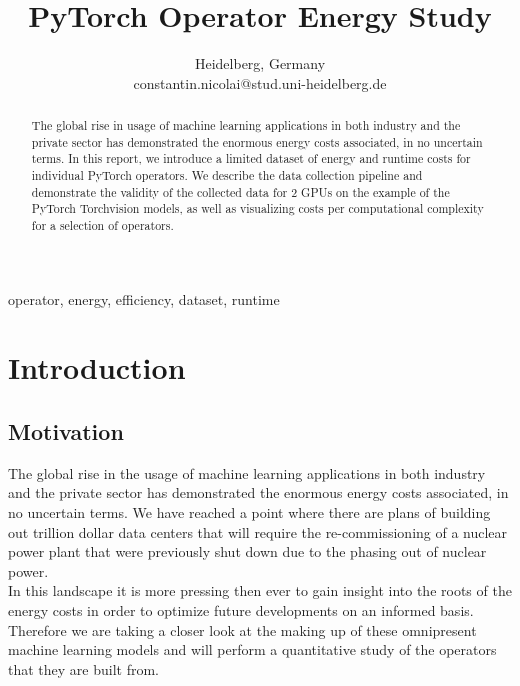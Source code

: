 \documentclass[conference]{IEEEtran}
\begin{document}
\title{PyTorch Operator Energy Study}

\author{
Heidelberg, Germany \\
constantin.nicolai@stud.uni-heidelberg.de}


\maketitle

\begin{abstract}
The global rise in usage of machine learning applications in both industry and the private sector has demonstrated the enormous energy costs associated, in no uncertain terms. In this report, we introduce a limited dataset of energy and runtime costs for individual PyTorch operators. We describe the data collection pipeline and demonstrate the validity of the collected data for 2 GPUs on the example of the PyTorch Torchvision models, as well as visualizing costs per computational complexity for a selection of operators.
\end{abstract}

\begin{IEEEkeywords}
operator, energy, efficiency, dataset, runtime
\end{IEEEkeywords}

\section{Introduction}


\subsection{Motivation}
The global rise in the usage of machine learning applications in both industry and the private sector has demonstrated the enormous energy costs associated, in no uncertain terms. We have reached a point where there are plans of building out trillion dollar data centers that will require the re-commissioning of a nuclear power plant that were previously shut down due to the phasing out of nuclear power. \\
In this landscape it is more pressing then ever to gain insight into the roots of the energy costs in order to optimize future developments on an informed basis. Therefore we are taking a closer look at the making up of these omnipresent machine learning models and will perform a quantitative study of the operators that they are built from.
\end{document}
